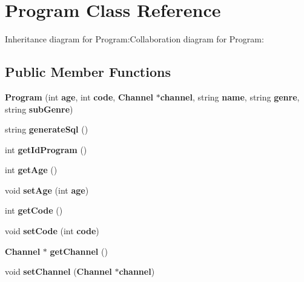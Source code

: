 \section{Program Class Reference}
\label{classbr_1_1ufscar_1_1lince_1_1ginga_1_1recommender_1_1Program}
Inheritance diagram for Program:Collaboration diagram for Program:\subsection*{Public Member Functions}
\begin{CompactItemize}
\item 
\textbf{Program} (int {\bf age}, int {\bf code}, {\bf Channel} $\ast${\bf channel}, string {\bf name}, string {\bf genre}, string {\bf subGenre})\label{classbr_1_1ufscar_1_1lince_1_1ginga_1_1recommender_1_1Program_bd450b42f9cdd7c427f4405d6ae6b155}

\item 
string \textbf{generateSql} ()\label{classbr_1_1ufscar_1_1lince_1_1ginga_1_1recommender_1_1Program_8f1e45f781da9a5727416350efd7d586}

\item 
int \textbf{getIdProgram} ()\label{classbr_1_1ufscar_1_1lince_1_1ginga_1_1recommender_1_1Program_806e0be4d955e431571304da09303048}

\item 
int \textbf{getAge} ()\label{classbr_1_1ufscar_1_1lince_1_1ginga_1_1recommender_1_1Program_44a88871339022e9a268d613b55f39a1}

\item 
void \textbf{setAge} (int {\bf age})\label{classbr_1_1ufscar_1_1lince_1_1ginga_1_1recommender_1_1Program_23e901febda7a2f14791b3557c247df0}

\item 
int \textbf{getCode} ()\label{classbr_1_1ufscar_1_1lince_1_1ginga_1_1recommender_1_1Program_8361b009dd85dd991e5e684d648ffabf}

\item 
void \textbf{setCode} (int {\bf code})\label{classbr_1_1ufscar_1_1lince_1_1ginga_1_1recommender_1_1Program_2520b3fc10894bb8fc4a96014dfb0d08}

\item 
{\bf Channel} $\ast$ \textbf{getChannel} ()\label{classbr_1_1ufscar_1_1lince_1_1ginga_1_1recommender_1_1Program_110d2ef7cdaff65291a8f8c377914630}

\item 
void \textbf{setChannel} ({\bf Channel} $\ast${\bf channel})\label{classbr_1_1ufscar_1_1lince_1_1ginga_1_1recommender_1_1Program_851720102a6a70fad0545639d1d61545}


\end{CompactItemize}
